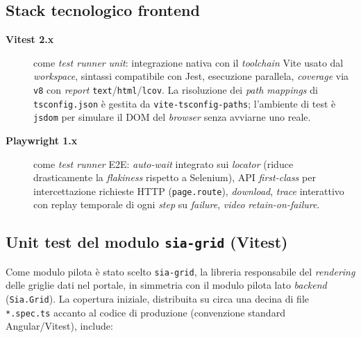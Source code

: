 \subsection{Stack tecnologico frontend}

\begin{description}
    \item[\textbf{Vitest 2.x}] come \emph{test runner} \emph{unit}: integrazione nativa con il \emph{toolchain} Vite usato dal \emph{workspace}, sintassi compatibile con Jest, esecuzione parallela, \emph{coverage} via \texttt{v8} con \emph{report} \texttt{text}/\texttt{html}/\texttt{lcov}. La risoluzione dei \emph{path mappings} di \texttt{tsconfig.json} è gestita da \texttt{vite-tsconfig-paths}; l'ambiente di test è \texttt{jsdom} per simulare il DOM del \emph{browser} senza avviarne uno reale.
    \item[\textbf{Playwright 1.x}] come \emph{test runner} E2E: \emph{auto-wait} integrato sui \emph{locator} (riduce drasticamente la \emph{flakiness} rispetto a Selenium), API \emph{first-class} per intercettazione richieste HTTP (\texttt{page.route}), \emph{download}, \emph{trace} interattivo con replay temporale di ogni \emph{step} su \emph{failure}, \emph{video} \emph{retain-on-failure}.
\end{description}

\subsection{Unit test del modulo \texttt{sia-grid} (Vitest)}

Come modulo pilota è stato scelto \texttt{sia-grid}, la libreria responsabile del \emph{rendering} delle griglie dati nel portale, in simmetria con il modulo pilota lato \emph{backend} (\texttt{Sia.Grid}). La copertura iniziale, distribuita su circa una decina di file \texttt{*.spec.ts} accanto al codice di produzione (convenzione standard Angular/Vitest), include:

